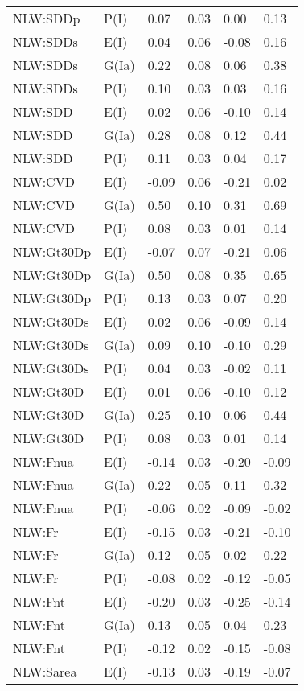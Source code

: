 \begin{center}
\begin{longtable}{|p{1.1in}|p{0.7in}|p{0.7in}|p{0.6in}|p{0.6in}|p{0.6in}|}
  NLW:SDDp & P(I) & 0.07 & 0.03 & 0.00 & 0.13 \\ 
  NLW:SDDs & E(I) & 0.04 & 0.06 & -0.08 & 0.16 \\ 
  NLW:SDDs & G(Ia) & 0.22 & 0.08 & 0.06 & 0.38 \\ 
  NLW:SDDs & P(I) & 0.10 & 0.03 & 0.03 & 0.16 \\ 
  NLW:SDD & E(I) & 0.02 & 0.06 & -0.10 & 0.14 \\ 
  NLW:SDD & G(Ia) & 0.28 & 0.08 & 0.12 & 0.44 \\ 
  NLW:SDD & P(I) & 0.11 & 0.03 & 0.04 & 0.17 \\ 
  NLW:CVD & E(I) & -0.09 & 0.06 & -0.21 & 0.02 \\ 
  NLW:CVD & G(Ia) & 0.50 & 0.10 & 0.31 & 0.69 \\ 
  NLW:CVD & P(I) & 0.08 & 0.03 & 0.01 & 0.14 \\ 
  NLW:Gt30Dp & E(I) & -0.07 & 0.07 & -0.21 & 0.06 \\ 
  NLW:Gt30Dp & G(Ia) & 0.50 & 0.08 & 0.35 & 0.65 \\ 
  NLW:Gt30Dp & P(I) & 0.13 & 0.03 & 0.07 & 0.20 \\ 
  NLW:Gt30Ds & E(I) & 0.02 & 0.06 & -0.09 & 0.14 \\ 
  NLW:Gt30Ds & G(Ia) & 0.09 & 0.10 & -0.10 & 0.29 \\ 
  NLW:Gt30Ds & P(I) & 0.04 & 0.03 & -0.02 & 0.11 \\ 
  NLW:Gt30D & E(I) & 0.01 & 0.06 & -0.10 & 0.12 \\ 
  NLW:Gt30D & G(Ia) & 0.25 & 0.10 & 0.06 & 0.44 \\ 
  NLW:Gt30D & P(I) & 0.08 & 0.03 & 0.01 & 0.14 \\ 
  NLW:Fnua & E(I) & -0.14 & 0.03 & -0.20 & -0.09 \\ 
  NLW:Fnua & G(Ia) & 0.22 & 0.05 & 0.11 & 0.32 \\ 
  NLW:Fnua & P(I) & -0.06 & 0.02 & -0.09 & -0.02 \\ 
  NLW:Fr & E(I) & -0.15 & 0.03 & -0.21 & -0.10 \\ 
  NLW:Fr & G(Ia) & 0.12 & 0.05 & 0.02 & 0.22 \\ 
  NLW:Fr & P(I) & -0.08 & 0.02 & -0.12 & -0.05 \\ 
  NLW:Fnt & E(I) & -0.20 & 0.03 & -0.25 & -0.14 \\ 
  NLW:Fnt & G(Ia) & 0.13 & 0.05 & 0.04 & 0.23 \\ 
  NLW:Fnt & P(I) & -0.12 & 0.02 & -0.15 & -0.08 \\ 
  NLW:Sarea & E(I) & -0.13 & 0.03 & -0.19 & -0.07 \\ 

\end{longtable}
\end{center}
